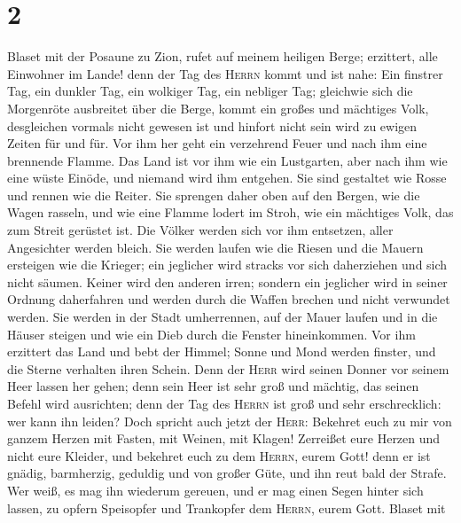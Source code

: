 \hypertarget{section-1}{%
\section{2}\label{section-1}}

 Blaset mit der Posaune zu Zion, rufet auf meinem heiligen
Berge; erzittert, alle Einwohner im Lande! denn der Tag des
\textsc{Herrn} kommt und ist nahe:  Ein finstrer Tag, ein
dunkler Tag, ein wolkiger Tag, ein nebliger Tag; gleichwie sich die
Morgenröte ausbreitet über die Berge, kommt ein großes und mächtiges
Volk, desgleichen vormals nicht gewesen ist und hinfort nicht sein wird
zu ewigen Zeiten für und für.  Vor ihm her geht ein
verzehrend Feuer und nach ihm eine brennende Flamme. Das Land ist vor
ihm wie ein Lustgarten, aber nach ihm wie eine wüste Einöde, und niemand
wird ihm entgehen.  Sie sind gestaltet wie Rosse und
rennen wie die Reiter.  Sie sprengen daher oben auf den
Bergen, wie die Wagen rasseln, und wie eine Flamme lodert im Stroh, wie
ein mächtiges Volk, das zum Streit gerüstet ist.  Die
Völker werden sich vor ihm entsetzen, aller Angesichter werden bleich.
 Sie werden laufen wie die Riesen und die Mauern ersteigen
wie die Krieger; ein jeglicher wird stracks vor sich daherziehen und
sich nicht säumen.  Keiner wird den anderen irren; sondern
ein jeglicher wird in seiner Ordnung daherfahren und werden durch die
Waffen brechen und nicht verwundet werden.  Sie werden in
der Stadt umherrennen, auf der Mauer laufen und in die Häuser steigen
und wie ein Dieb durch die Fenster hineinkommen.  Vor ihm
erzittert das Land und bebt der Himmel; Sonne und Mond werden finster,
und die Sterne verhalten ihren Schein.  Denn der
\textsc{Herr} wird seinen Donner vor seinem Heer lassen her gehen; denn
sein Heer ist sehr groß und mächtig, das seinen Befehl wird ausrichten;
denn der Tag des \textsc{Herrn} ist groß und sehr erschrecklich: wer
kann ihn leiden?  Doch spricht auch jetzt der
\textsc{Herr}: Bekehret euch zu mir von ganzem Herzen mit Fasten, mit
Weinen, mit Klagen!  Zerreißet eure Herzen und nicht eure
Kleider, und bekehret euch zu dem \textsc{Herrn}, eurem Gott! denn er
ist gnädig, barmherzig, geduldig und von großer Güte, und ihn reut bald
der Strafe.  Wer weiß, es mag ihn wiederum gereuen, und
er mag einen Segen hinter sich lassen, zu opfern Speisopfer und
Trankopfer dem \textsc{Herrn}, eurem Gott.  Blaset mit
